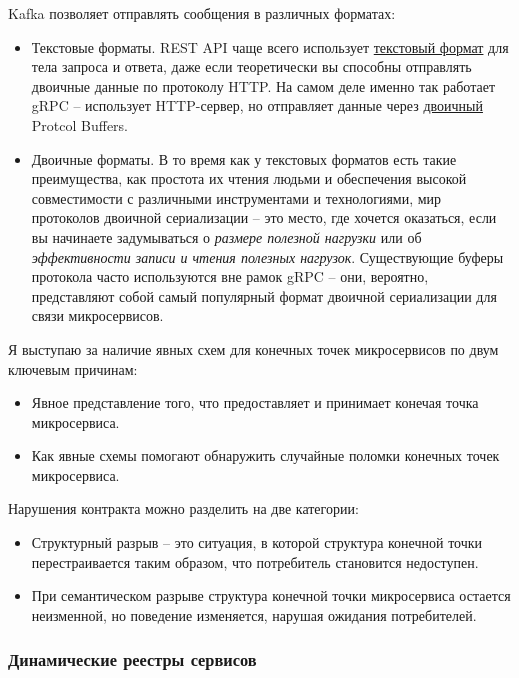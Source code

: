 \documentclass[%
	11pt,
	a4paper,
	utf8,
		]{article}
\begin{document}
Kafka позволяет отправлять сообщения в различных форматах:
\begin{itemize}
	\item Текстовые форматы. REST API чаще всего использует \underline{текстовый формат} для тела запроса и ответа, даже если теоретически вы способны отправлять двоичные данные по протоколу HTTP. На самом деле именно так работает gRPC -- использует HTTP-сервер, но отправляет данные через \underline{двоичный} Protcol Buffers. 
	
	\item Двоичные форматы. В то время как у текстовых форматов есть такие преимущества, как простота их чтения людьми и обеспечения высокой совместимости с различными инструментами и технологиями, мир протоколов двоичной сериализации -- это место, где хочется оказаться, если вы начинаете задумываться о \emph{размере полезной нагрузки} или об \emph{эффективности записи и чтения полезных нагрузок}. Существующие буферы протокола часто используются вне рамок gRPC -- они, вероятно, представляют собой самый популярный формат двоичной сериализации для связи микросервисов.
\end{itemize}

Я выступаю за наличие явных схем для конечных точек микросервисов по двум ключевым причинам:
\begin{itemize}
	\item Явное представление того, что предоставляет и принимает конечая точка микросервиса.
	
	\item Как явные схемы помогают обнаружить случайные поломки конечных точек микросервиса.
\end{itemize}

Нарушения контракта можно разделить на две категории:
\begin{itemize}
	\item Структурный разрыв -- это ситуация, в которой структура конечной точки перестраивается таким образом, что потребитель становится недоступен.
	
	\item При семантическом разрыве структура конечной точки микросервиса остается неизменной, но поведение изменяется, нарушая ожидания потребителей.
\end{itemize}

\subsubsection{Динамические реестры сервисов}
\end{document}
